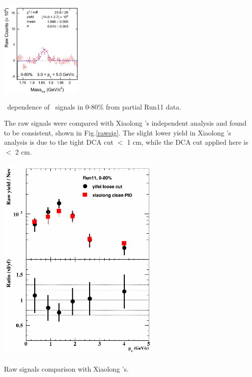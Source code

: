 \includegraphics[width=0.3\textwidth]{figure/Run11_YF/D0_0-80_31_50_signal.png}
\caption{\pt\ dependence of \dzero\ signals in 0-80\% from partial Run11 data.}
\label{D0inpt1}
\efg

The raw signals were compared with Xiaolong 's independent analysis and found to be consistent, shown in Fig.\ref{rawsig}. The slight lower yield in Xiaolong 's analysis is due to the tight DCA cut $<$ 1 cm, while the DCA cut applied here is $<$ 2 cm.

\bfg \centering
\includegraphics[width=0.6\textwidth]{figure/Run11_YF/RawY_0_80.png}
\caption{Raw signals comparison with Xiaolong 's.}
\label{rawsig}
\efg

